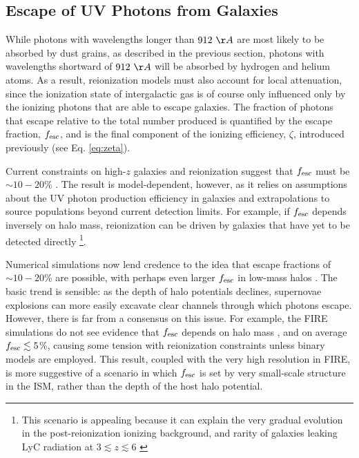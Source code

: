 \subsection{Escape of UV Photons from Galaxies} \label{sec:fesc}
While photons with wavelengths longer than $912 \ \AA$ are most likely to be absorbed by dust grains, as described in the previous section, photons with wavelengths shortward of $912 \ \AA$ will be absorbed by hydrogen and helium atoms. As a result, reionization models must also account for local attenuation, since the ionization state of intergalactic gas is of course only influenced only by the ionizing photons that are able to escape galaxies. The fraction of photons that escape relative to the total number produced is quantified by the escape fraction, $f_{\text{esc}}$, and is the final component of the ionizing efficiency, $\zeta$, introduced previously (see Eq. \ref{eq:zeta}).

Current constraints on high-$z$ galaxies and reionization suggest that $f_{\text{esc}}$ must be $\sim 10-20\%$ \cite{Robertson2015}. The result is model-dependent, however, as it relies on assumptions about the UV photon production efficiency in galaxies and extrapolations to source populations beyond current detection limits. For example, if $f_{\text{esc}}$ depends inversely on halo mass, reionization can be driven by galaxies that have yet to be detected directly \cite{Finkelstein2019}\footnote{This scenario is appealing because it can explain the very gradual evolution in the post-reionization ionizing background, and rarity of galaxies leaking LyC radiation at $3 \lesssim z \lesssim 6$ \cite{Shapley2006}}.

Numerical simulations now lend credence to the idea that escape fractions of $\sim 10-20$\% are possible, with perhaps even larger $f_{\text{esc}}$ in low-mass halos \cite{Kimm2014,Xu2016}. The basic trend is sensible: as the depth of halo potentials declines, supernovae explosions can more easily excavate clear channels through which photons escape. However, there is far from a consensus on this issue. For example, the \textsc{FIRE} simulations do not see evidence that $f_{\text{esc}}$ depends on halo mass \cite{Ma2015}, and on average $f_{\text{esc}} \lesssim 5$\%, causing some tension with reionization constraints unless binary models \cite{Eldridge2009} are employed. This result, coupled with the very high resolution in \textsc{FIRE}, is more suggestive of a scenario in which $f_{\text{esc}}$ is set by very small-scale structure in the ISM, rather than the depth of the host halo potential.

